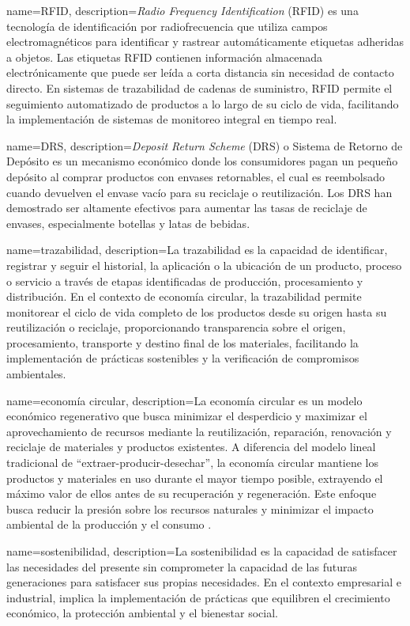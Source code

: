 {
    name=RFID,
    description={\textit{Radio Frequency Identification} (RFID) es una tecnología de identificación por radiofrecuencia que utiliza campos electromagnéticos para identificar y rastrear automáticamente etiquetas adheridas a objetos. Las etiquetas RFID contienen información almacenada electrónicamente que puede ser leída a corta distancia sin necesidad de contacto directo. En sistemas de trazabilidad de cadenas de suministro, RFID permite el seguimiento automatizado de productos a lo largo de su ciclo de vida, facilitando la implementación de sistemas de monitoreo integral en tiempo real.}
}

{
    name=DRS,
    description={\textit{Deposit Return Scheme} (DRS) o Sistema de Retorno de Depósito es un mecanismo económico donde los consumidores pagan un pequeño depósito al comprar productos con envases retornables, el cual es reembolsado cuando devuelven el envase vacío para su reciclaje o reutilización. Los DRS han demostrado ser altamente efectivos para aumentar las tasas de reciclaje de envases, especialmente botellas y latas de bebidas.}
}

{
    name=trazabilidad,
    description={La trazabilidad es la capacidad de identificar, registrar y seguir el historial, la aplicación o la ubicación de un producto, proceso o servicio a través de etapas identificadas de producción, procesamiento y distribución. En el contexto de economía circular, la trazabilidad permite monitorear el ciclo de vida completo de los productos desde su origen hasta su reutilización o reciclaje, proporcionando transparencia sobre el origen, procesamiento, transporte y destino final de los materiales, facilitando la implementación de prácticas sostenibles y la verificación de compromisos ambientales.}
}

{
    name=economía circular,
    description={La economía circular es un modelo económico regenerativo que busca minimizar el desperdicio y maximizar el aprovechamiento de recursos mediante la reutilización, reparación, renovación y reciclaje de materiales y productos existentes. A diferencia del modelo lineal tradicional de ``extraer-producir-desechar'', la economía circular mantiene los productos y materiales en uso durante el mayor tiempo posible, extrayendo el máximo valor de ellos antes de su recuperación y regeneración. Este enfoque busca reducir la presión sobre los recursos naturales y minimizar el impacto ambiental de la producción y el consumo \cite{cerda2016economia}.}
}

{
    name=sostenibilidad,
    description={La sostenibilidad es la capacidad de satisfacer las necesidades del presente sin comprometer la capacidad de las futuras generaciones para satisfacer sus propias necesidades. En el contexto empresarial e industrial, implica la implementación de prácticas que equilibren el crecimiento económico, la protección ambiental y el bienestar social.}
}
